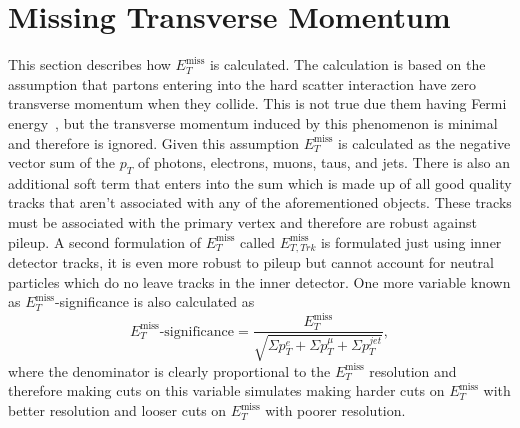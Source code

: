 \section{Missing Transverse Momentum}
\label{sec:met}
This section describes how $E_T^{\text{miss}}$ is calculated. The calculation is based
on the assumption that partons entering into the hard scatter interaction have
zero transverse momentum when they collide. This is not true due them having
Fermi energy~\cite{fermi-energy}, but the transverse momentum induced by this
phenomenon is minimal and therefore is ignored. Given this assumption
$E_T^{\text{miss}}$ is calculated as the negative vector sum of the $p_T$ of
photons, electrons, muons, taus, and jets. There is also an additional soft term
that enters into the sum which is made up of all good quality tracks that aren't
associated with any of the aforementioned objects. These tracks must be
associated with the primary vertex and therefore are robust against pileup. A
second formulation of $E_T^{\text{miss}}$ called $E_{T, Trk}^{\text{miss}}$ is
formulated just using inner detector tracks, it is even more robust to pileup
but cannot account for neutral particles which do no leave tracks in the inner
detector. One more variable known as $E_T^{\text{miss}}$-significance is also
calculated as
\begin{equation}
  E_T^{\text{miss}}\text{-significance} =
  \frac{E_T^{\text{miss}}}{\sqrt{\Sigma p_T^e + \Sigma p_T^\mu + \Sigma p_T^{jet}}},
  \label{eq:metsig}
\end{equation}
where the denominator is clearly proportional to the $E_T^{\text{miss}}$
resolution and therefore making cuts on this variable simulates making harder
cuts on $E_T^{\text{miss}}$ with better resolution and looser cuts on
$E_T^{\text{miss}}$ with poorer resolution.

